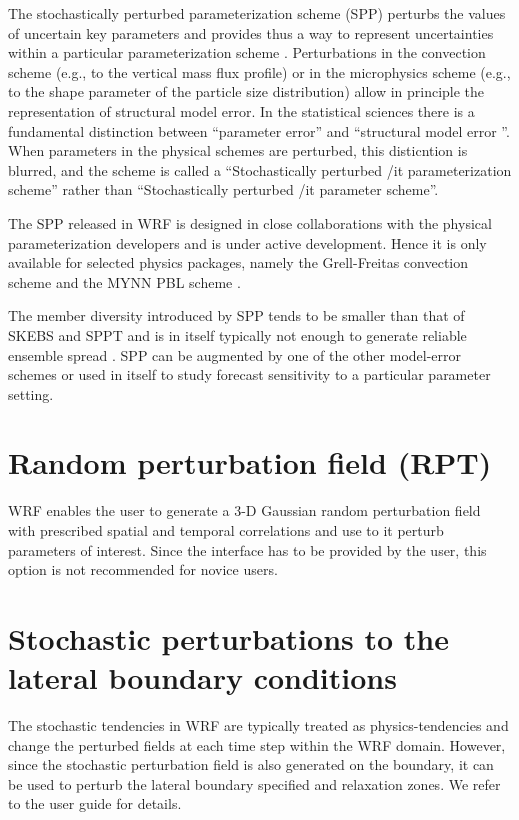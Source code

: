 The stochastically perturbed parameterization scheme (SPP)
perturbs the values of uncertain key parameters and provides 
thus a way to represent uncertainties within a particular parameterization scheme
\citep{Bo08,Ha11a}.
Perturbations in the convection scheme (e.g., to the vertical mass flux 
profile) or in the microphysics scheme (e.g., to the shape parameter of 
the particle size distribution) allow in principle the representation of
structural model error.  In the statistical sciences there is a fundamental 
distinction between ``parameter error'' and 
``structural model error ''. When parameters in the physical schemes 
are perturbed, this disticntion is blurred, and the scheme is 
called a ``Stochastically perturbed {/it parameterization} scheme''
rather than ``Stochastically perturbed {/it parameter} scheme''. 

The SPP released in WRF is designed in close collaborations with the physical
parameterization developers and is under active development. Hence it is only
available for selected physics packages, namely the Grell-Freitas convection
scheme and the MYNN PBL scheme \citep{jankov2017performance}.

The member diversity introduced by SPP tends to be smaller than that of SKEBS and SPPT 
and is in itself typically not enough to generate reliable ensemble spread 
\citep{Be15}.
SPP can be augmented by one of the other model-error schemes or used in itself to study 
forecast sensitivity to a particular parameter setting.

\section {Random perturbation field (RPT)}
WRF enables the user to generate a 3-D Gaussian random perturbation field
with prescribed spatial and temporal correlations and use to it perturb
parameters of interest.  Since the interface has to be provided by the
user, this option is not recommended for novice users.

\section {Stochastic perturbations to the lateral boundary conditions}
The stochastic tendencies in WRF are typically treated as physics-tendencies and change the 
perturbed fields at each time step within the WRF domain. However, since the stochastic
perturbation field is also generated on the boundary, it can be used to perturb the lateral boundary specified and relaxation zones. We refer to the user guide for details.

